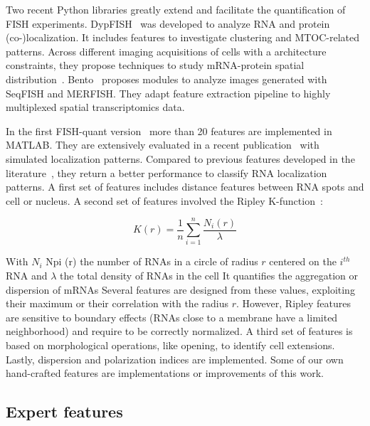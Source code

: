 Two recent Python libraries greatly extend and facilitate the quantification of \ac{FISH} experiments.
DypFISH~\cite{savulescu_dypfish_2019} was developed to analyze \ac{RNA} and protein (co-)localization.
It includes features to investigate clustering and \ac{MTOC}-related patterns.
Across different imaging acquisitions of cells with a architecture constraints, they propose techniques to study \ac{mRNA}-protein spatial distribution~\cite{savulescu_interrogating_2021}.
Bento~\cite{mah_bento_2022} proposes modules to analyze images generated with \ac{SeqFISH} and \ac{MERFISH}.
They adapt feature extraction pipeline to highly multiplexed spatial transcriptomics data.

In the first FISH-quant version~\cite{mueller_fish-quant_2013} more than 20 features are implemented in MATLAB.
They are extensively evaluated in a recent publication~\cite{samacoits_computational_2018} with simulated localization patterns.
Compared to previous features developed in the literature~\cite{battich_image-based_2013}, they return a better performance to classify \ac{RNA} localization patterns.
A first set of features includes distance features between \ac{RNA} spots and cell or nucleus.
A second set of features involved the Ripley K-function~\cite{ripley2005spatial}:

\begin{equation}
	{\displaystyle K(r) = \frac{1}{n} \sum_{i = 1}^{n} \frac{N_i(r)}{\lambda}}
\end{equation}

\noindent
With $N_i$ Npi (r) the number of \ac{RNA}s in a circle of radius $r$ centered on the $i^{th}$ \ac{RNA} and $\lambda$ the total density of \ac{RNA}s in the cell
It quantifies the aggregation or dispersion of mRNAs
Several features are designed from these values, exploiting their maximum or their correlation with the radius $r$.
However, Ripley features are sensitive to boundary effects (\ac{RNA}s close to a membrane have a limited neighborhood) and require to be correctly normalized.
A third set of features is based on morphological operations, like opening, to identify cell extensions.
Lastly, dispersion and polarization indices are implemented.
Some of our own hand-crafted features are implementations or improvements of this work.

\subsection{Expert features}
\label{subsec:expert_features}

